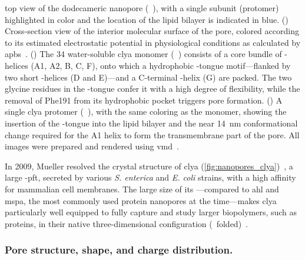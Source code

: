 \begin{figure*}[p]
{  %
  top view of the dodecameric  nanopore (~\cite{Peng-2019}), with a single
  subunit (protomer) highlighted in color and the location of the lipid bilayer is indicated in blue.
  ()
  Cross-section view of the interior molecular surface of the pore, colored according to its estimated
  electrostatic potential in physiological conditions as calculated by
  \gls{apbs}~\cite{Baker-2001,Baker-2005}.
  ()
  The \SI{34}{\kDa} water-soluble \gls{clya} monomer (~\cite{Wallace-2000}) consists of a core
  bundle of \ta-helices (\ta A1, \ta A2, \ta B, \ta C, \ta F), onto which a hydrophobic \tb-tongue
  motif---flanked by two short \ta-helices (\ta D and \ta E)---and a C-terminal \ta-helix (\ta G) are packed.
  The two glycine residues in the \tb-tongue confer it with a high degree of flexibility, while the removal of
  Phe191 from its hydrophobic pocket triggers pore formation.
  ()
  A single \gls{clya} protomer (~\cite{Peng-2019}), with the same coloring as the monomer, showing
  the insertion of the \ta-tongue into the lipid bilayer and the near \SI{14}{\nm} conformational change
  required for the \ta A1 helix to form the transmembrane part of the pore.
  All images were prepared and rendered using \gls{vmd}~\cite{Humphrey-1996,Stone-1998}.
  }\label{fig:nanopores_clya}
\end{figure*}

In 2009, Mueller \etal{} resolved the crystal structure of \gls{clya}
(\cref{fig:nanopores_clya})~\cite{Mueller-2009}, a large \ta-\gls{pft}, secreted by various \textit{S.
enterica} and \textit{E. coli} strains, with a high affinity for mammalian cell membranes. The large size of
its \lumen{}---compared to \gls{ahl} and \gls{mspa}, the most commonly used protein nanopores at the
time---makes \gls{clya} particularly well equipped to fully capture and study larger biopolymers, such as
proteins, in their native three-dimensional configuration
(\ie~folded)~\cite{Soskine-2013,Soskine-Biesemans-2015}.


\subsubsection{Pore structure, shape, and charge distribution.}
%

